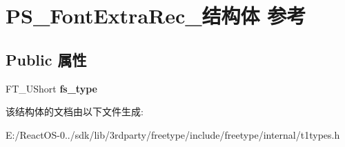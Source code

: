 \hypertarget{struct_p_s___font_extra_rec__}{}\section{P\+S\+\_\+\+Font\+Extra\+Rec\+\_\+结构体 参考}
\label{struct_p_s___font_extra_rec__}
\subsection*{Public 属性}
\begin{DoxyCompactItemize}
\item 
\mbox{\label{struct_p_s___font_extra_rec___a048e1e57ee974c3e05e9a88476e6b8a9}} 
F\+T\+\_\+\+U\+Short {\bfseries fs\+\_\+type}
\end{DoxyCompactItemize}


该结构体的文档由以下文件生成\+:\begin{DoxyCompactItemize}
\item 
E\+:/\+React\+O\+S-\/0../sdk/lib/3rdparty/freetype/include/freetype/internal/t1types.\+h\end{DoxyCompactItemize}
